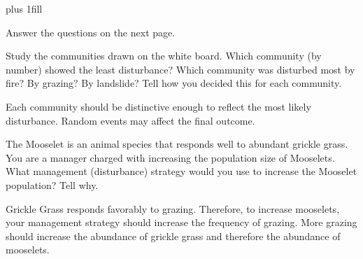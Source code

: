 \documentclass[12pt, hidelinks]{exam}
\newcommand*\AnswerBox[2]{%
    \parbox[t][#1]{0.92\textwidth}{%
    \begin{solution}#2\end{solution}}
    \vspace{\stretch{1}}
}
\newlength{\basespace}
\newcommand*\AnswerBlank[1]{%
	\ifprintanswers%
		\textbf{#1}
	\else%
		\rule{0.75in}{0.4pt}\kern0.67pt.\fi%
	}
\begin{document}
\begin{questions}
\vskip0pt plus 1fill

Answer the questions on the next page.

\newpage

\question
Study the communities drawn on the white board. Which community (by number) showed the least disturbance? Which community was disturbed most by fire? By grazing? By landslide? Tell how you decided this for each community. \medskip


\AnswerBox{1\basespace}{Each community should be distinctive enough to reflect the most likely disturbance. Random events may affect the final outcome.}

\question[Checkout]
The Mooselet is an animal species that responds well to abundant grickle grass. You are a manager charged with increasing the population size of Mooselets. What management (disturbance) strategy would you use to increase the Mooselet population? Tell why.

\AnswerBox{2\basespace}{Grickle Grass responds favorably to grazing. Therefore, to increase
	mooselets, your management strategy should increase the frequency of grazing. More grazing
	should increase the abundance of grickle grass and therefore the abundance of mooselets.}



\end{questions}
	
\end{document}
